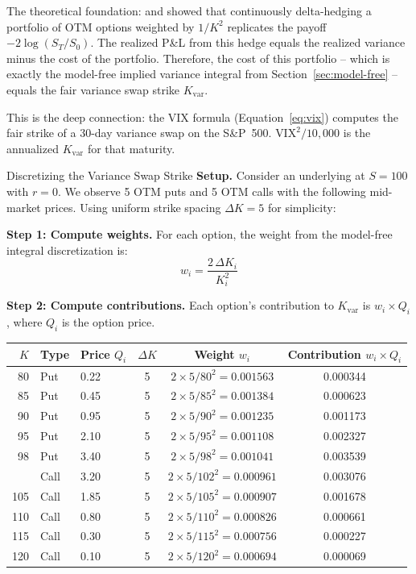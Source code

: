 The theoretical foundation: \citet{BrittenJones2000} and \citet{Carr2009} showed that continuously delta-hedging a portfolio of OTM options weighted by $1/K^2$ replicates the payoff $-2\log(S_T/S_0)$.
The realized P\&L from this hedge equals the realized variance minus the cost of the portfolio.
Therefore, the cost of this portfolio -- which is exactly the model-free implied variance integral from Section~\ref{sec:model-free} -- equals the fair variance swap strike $K_{\text{var}}$.

This is the deep connection: the VIX formula (Equation~\ref{eq:vix}) computes the fair strike of a 30-day variance swap on the S\&P~500.
$\text{VIX}^2 / 10{,}000$ is the annualized $K_{\text{var}}$ for that maturity.

\begin{workedexample}{Discretizing the Variance Swap Strike}
\label{ex:varswap-strike}
\textbf{Setup.} Consider an underlying at $S = 100$ with $r = 0$.
We observe 5 OTM puts and 5 OTM calls with the following mid-market prices.
Using uniform strike spacing $\Delta K = 5$ for simplicity:

\textbf{Step 1: Compute weights.}
For each option, the weight from the model-free integral discretization is:
\[
  w_i = \frac{2\,\Delta K_i}{K_i^2}
\]

\textbf{Step 2: Compute contributions.}
Each option's contribution to $K_{\text{var}}$ is $w_i \times Q_i$, where $Q_i$ is the option price.

\begin{center}
\begin{tabular}{@{}rllccc@{}}
\toprule
$K$ & Type & Price $Q_i$ & $\Delta K$ & Weight $w_i$ & Contribution $w_i \times Q_i$ \\
\midrule
80  & Put  & 0.22 & 5 & $2 \times 5 / 80^2 = 0.001563$ & 0.000344 \\
85  & Put  & 0.45 & 5 & $2 \times 5 / 85^2 = 0.001384$ & 0.000623 \\
90  & Put  & 0.95 & 5 & $2 \times 5 / 90^2 = 0.001235$ & 0.001173 \\
95  & Put  & 2.10 & 5 & $2 \times 5 / 95^2 = 0.001108$ & 0.002327 \\
98  & Put  & 3.40 & 5 & $2 \times 5 / 98^2 = 0.001041$ & 0.003539 \\
\addlinespace
102 & Call & 3.20 & 5 & $2 \times 5 / 102^2 = 0.000961$ & 0.003076 \\
105 & Call & 1.85 & 5 & $2 \times 5 / 105^2 = 0.000907$ & 0.001678 \\
110 & Call & 0.80 & 5 & $2 \times 5 / 110^2 = 0.000826$ & 0.000661 \\
115 & Call & 0.30 & 5 & $2 \times 5 / 115^2 = 0.000756$ & 0.000227 \\
120 & Call & 0.10 & 5 & $2 \times 5 / 120^2 = 0.000694$ & 0.000069 \\
\bottomrule
\end{tabular}
\end{center}


\end{workedexample}
